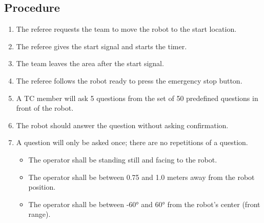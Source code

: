 \subsection*{Procedure}
	\begin{enumerate}[nosep]
		\item The referee requests the team to move the robot to the start location.
		\item The referee gives the start signal and starts the timer.
		\item The team leaves the area after the start signal.		
		\item The referee follows the robot ready to press the emergency stop button.
		
		\item A TC member will ask 5 questions from the set of 50 predefined questions in front of the robot.
		\item The robot should answer the question without asking confirmation.
		\item A question will only be asked once; there are no repetitions of a question.
		\begin{itemize}
		    \item The operator shall be standing still and facing to the robot.
		    \item The operator shall be between 0.75 and 1.0 meters away from the robot position.
    		\item The operator shall be between -60° and 60° from the robot’s center (front range).
		\end{itemize}
	\end{enumerate}

